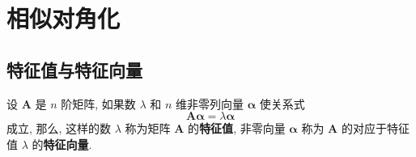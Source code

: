 \documentclass[12pt, a4paper, oneside, UTF8]{ctexbook}
\begin{document}
% 
\else
\fi
\chapter{相似对角化}
\section{特征值与特征向量}
\begin{definition}
	设 $\bm{A}$ 是 $n$ 阶矩阵, 如果数 $\lambda$ 和 $n$ 维非零列向量 $\bm{\alpha}$ 使关系式
	\begin{equation}
		\bm{A}\bm{\alpha} = \lambda\bm{\alpha}
	\end{equation}
	成立, 那么, 这样的数 $\lambda$ 称为矩阵 $\bm{A}$ 的\textbf{特征值}, 非零向量 $\bm{\alpha}$ 称为 $\bm{A}$ 的对应于特征值 $\lambda$ 的\textbf{特征向量}.
\end{definition}
\end{document}
